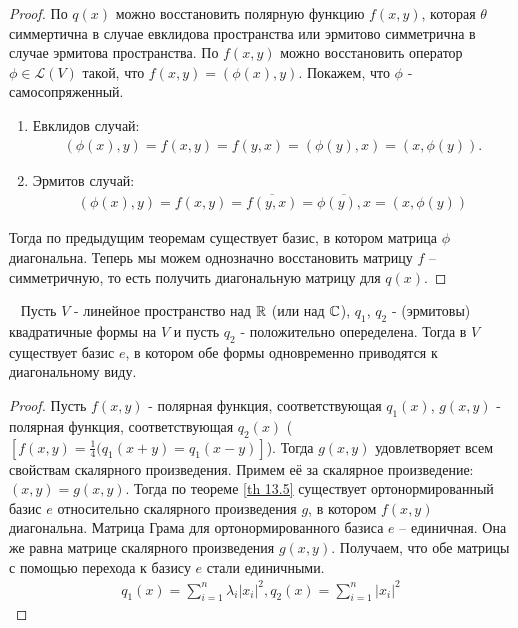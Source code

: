 \begin{proof}
    По $q(x)$ можно восстановить полярную функцию $f(x, y)$, которая $\theta$ симмертична в случае евклидова пространства или эрмитово симметрична в случае эрмитова пространства.
    По $f(x, y)$ можно восстановить оператор $\phi \in \mathcal{L}(V)$ такой, что $f(x, y) = (\phi(x), y)$.
    Покажем, что $\phi$ - самосопряженный.
    \begin{enumerate}
        \item Евклидов случай:
        \begin{gather*}
            (\phi(x), y) = f(x, y) = f(y, x) = (\phi(y), x) = (x, \phi(y)).
        \end{gather*}
        \item Эрмитов случай:
        \begin{gather*}
            (\phi(x), y) = f(x, y) = \overline{f(y, x)} = \overline{\phi(y), x} = (x, \phi(y))
        \end{gather*}
    \end{enumerate}
    Тогда по предыдущим теоремам существует базис, в котором матрица $\phi$ диагональна. Теперь мы можем однозначно восстановить матрицу $f$ -- симметричную, то есть получить диагональную матрицу для $q(x)$.
\end{proof}

\begin{theorem}~
    Пусть $V$ - линейное пространство над $\mathbb{R}$ (или над $\mathbb{C}$), $q_1$, $q_2$ - (эрмитовы) квадратичные формы на $V$ и пусть $q_2$ - положительно опеределена. Тогда в $V$ существует базис 
    $e$, в котором обе формы одновременно приводятся к диагональному виду.
\end{theorem}

\begin{proof}
    Пусть $f(x, y)$ - полярная функция, соответствующая $q_1(x)$, $g(x, y)$ - полярная функция, соответствующая $q_2(x)$ ($[f(x, y) = \frac{1}{4}(q_1(x + y) = q_1(x - y)]$). Тогда $g(x, y)$ удовлетворяет всем свойствам скалярного произведения. 
    Примем её за скалярное произведение: $(x, y) = g(x, y)$. Тогда по теореме \ref{th 13.5} существует ортонормированный базис $e$ 
    относительно скалярного произведения $g$, в котором $f(x, y)$ диагональна. Матрица Грама для ортонормированного базиса $e$ -- единичная. Она же равна матрице скалярного произведения $g(x, y)$. Получаем, что обе матрицы с помощью перехода к базису $e$ стали единичными.
    \begin{gather*}
        q_1(x) = \sum_{i=1}^{n} \lambda_i |x_i|^2, q_2(x) = \sum_{i=1}^{n} |x_i|^2 
    \end{gather*}
\end{proof}